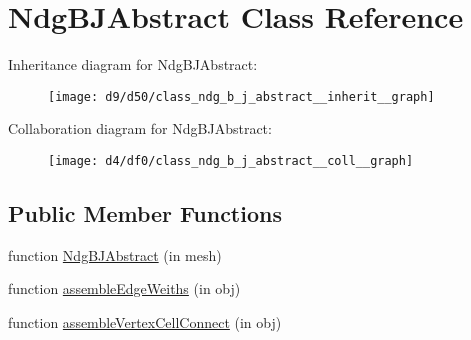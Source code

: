 \hypertarget{class_ndg_b_j_abstract}{}\section{Ndg\+B\+J\+Abstract Class Reference}
\label{class_ndg_b_j_abstract}


Inheritance diagram for Ndg\+B\+J\+Abstract\+:
\nopagebreak
\begin{figure}[H]
\begin{center}
\leavevmode
\texttt{[image: d9/d50/class\_ndg\_b\_j\_abstract\_\_inherit\_\_graph]}
\end{center}
\end{figure}


Collaboration diagram for Ndg\+B\+J\+Abstract\+:
\nopagebreak
\begin{figure}[H]
\begin{center}
\leavevmode
\texttt{[image: d4/df0/class\_ndg\_b\_j\_abstract\_\_coll\_\_graph]}
\end{center}
\end{figure}
\subsection*{Public Member Functions}
\begin{DoxyCompactItemize}
\item 
function \hyperlink{class_ndg_b_j_abstract_a70d4d64d7cddaa6cecc7b01218827dfa}{Ndg\+B\+J\+Abstract} (in mesh)
\item 
function \hyperlink{class_ndg_b_j_abstract_a3a79227ee646fc05454000741840d378}{assemble\+Edge\+Weiths} (in obj)
\item 
function \hyperlink{class_ndg_b_j_abstract_a71fd5973a7f2f0c3181ea20dc16ff305}{assemble\+Vertex\+Cell\+Connect} (in obj)
\end{DoxyCompactItemize}

